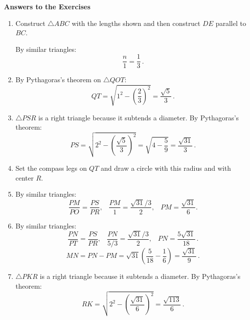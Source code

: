 \documentclass[11pt,a4paper]{report}
\begin{document}
\newpage

\begin{center}
\textbf{\Large Answers to the Exercises}
\end{center}

\begin{enumerate}

\item Construct $\triangle ABC$ with the lengths shown and then construct $DE$ parallel to $BC$. 
\vspace*{-1ex}
\begin{center}
\end{center}
By similar triangles:
\[
\frac{n}{1} = \frac{1}{3}\,.
\]

\item By Pythagoras's theorem on $\triangle QOT$:
\[
QT = \sqrt{1^2-\left(\frac{2}{3}\right)^2}=\frac{\sqrt{5}}{3}\,.
\]

\item $\triangle PSR$ is a right triangle because it subtends a diameter. By Pythagoras's theorem:
\[
PS = \sqrt{2^2-\left(\frac{\sqrt{5}}{3}\right)^2}=\sqrt{4-\frac{5}{9}}=\frac{\sqrt{31}}{3}\,.
\]

\item Set the compass legs on $QT$ and draw a circle with this radius and with center $R$.

\item By similar triangles:
\[
\frac{PM}{PO}=\frac{PS}{PR},\;\;\;\frac{PM}{1}=\frac{\sqrt{31}/3}{2},\;\;\;PM=\frac{\sqrt{31}}{6}.
\]

\item By similar triangles:
\[
\frac{PN}{PT}=\frac{PS}{PR},\;\;\;\frac{PN}{5/3}=\frac{\sqrt{31}/3}{2},\;\;\;PN=\frac{5\sqrt{31}}{18}\,.
\]
\[
MN=PN-PM = \sqrt{31}\left(\frac{5}{18}-\frac{1}{6}\right) = \frac{\sqrt{31}}{9}\,.
\]

\item $\triangle PKR$ is a right triangle because it subtends a diameter. By Pythagoras's theorem:
\[
RK=\sqrt{2^2-\left(\frac{\sqrt{31}}{6}\right)^2} = \frac{\sqrt{113}}{6}\,.
\]


\end{enumerate}
\end{document}
